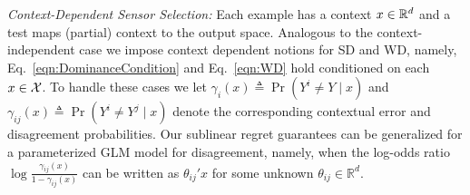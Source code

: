 \noindent
{\it Context-Dependent Sensor Selection:}
Each example has a context $x \in \mathbb{R}^d$ and a test maps (partial) context to the output space. Analogous to the context-independent case we impose context dependent notions for SD and WD, namely, Eq.~\ref{eqn:DominanceCondition} and Eq.~\ref{eqn:WD} hold conditioned on each $x \in {\cal X}$. To handle these cases we let $\gamma_i(x)\triangleq \Pr(Y^{i} \neq Y\mid x)$ and $\gamma_{ij}(x) \triangleq \Pr(Y^{i} \neq Y^{j}\mid x)$ denote the corresponding contextual error and disagreement probabilities. Our sublinear regret guarantees can be generalized for a parameterized GLM model for disagreement, namely, when the log-odds ratio $\log \frac{\gamma_{ij}(x)}{1-\gamma_{ij}(x)}$ can be written as $\theta_{ij}'x$ for some unknown $\theta_{ij} \in \mathbb{R}^d$.
\vspace{-5pt}

